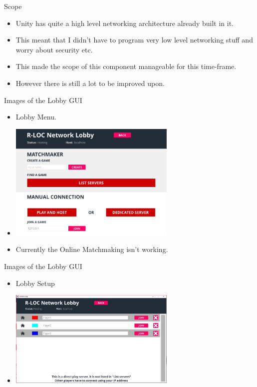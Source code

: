 \documentclass{beamer}
\begin{document}
\begin{frame}{Scope}
	\begin{itemize}
		\item Unity has quite a high level networking architecture already built in it.  \pause
		\item This meant that I didn't have to program very low level networking stuff and worry about security etc. \pause
		\item This made the scope of this component manageable for this time-frame. \pause
		\item However there is still a lot to be improved upon.
	\end{itemize}
\end{frame}

\begin{frame}{Images of the Lobby GUI}
	\begin{itemize}
		\item Lobby Menu. \pause
		\item \includegraphics[width=8cm]{LobbyGUI} \pause
		\item Currently the Online Matchmaking isn't working.
	\end{itemize}
\end{frame}

\begin{frame}{Images of the Lobby GUI}
	\begin{itemize}
		\item Lobby Setup \pause
		\item \includegraphics[width=8cm]{LobbySetup}
	\end{itemize}
\end{frame}
\end{document}
